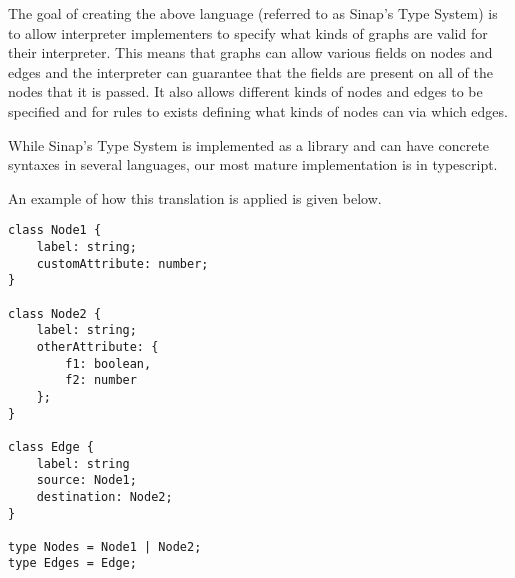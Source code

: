 \documentclass{article}
\begin{document}
The goal of creating the above language (referred to as Sinap's 
Type System) is to allow interpreter implementers to specify what 
kinds of graphs are valid for their interpreter. This means that 
graphs can allow various fields on nodes and edges and the interpreter
can guarantee that the fields are present on all of the nodes that it
is passed. It also allows different kinds of nodes and edges to be 
specified and for rules to exists defining what kinds of nodes can 
via which edges. 

While Sinap's Type System is implemented as a library and can have 
concrete syntaxes in several languages, our most mature implementation 
is in typescript. 

An example of how this translation is applied is given below.

\begin{verbatim}
class Node1 {
    label: string;
    customAttribute: number;
}

class Node2 {
    label: string;
    otherAttribute: {
        f1: boolean,
        f2: number
    };
}

class Edge {
    label: string
    source: Node1;
    destination: Node2;
}

type Nodes = Node1 | Node2;
type Edges = Edge;
\end{verbatim}
\end{document}
